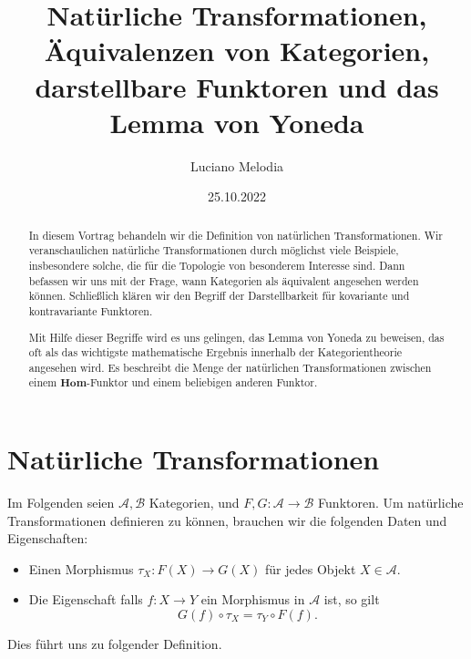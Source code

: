 \documentclass[leqno]{article}
\title{Natürliche Transformationen, Äquivalenzen von Kategorien, darstellbare Funktoren und das Lemma von Yoneda}
\author{Luciano Melodia}
\date{25.10.2022}
\theoremstyle{plain}
\theoremstyle{definition}
\theoremstyle{remark}
\begin{document}
\maketitle

\begin{abstract}
In diesem Vortrag behandeln wir die Definition von natürlichen Transformationen. Wir veranschaulichen natürliche Transformationen durch möglichst viele Beispiele, insbesondere solche, die für die Topologie von besonderem Interesse sind. Dann befassen wir uns mit der Frage, wann Kategorien als äquivalent angesehen werden können. Schließlich klären wir den Begriff der Darstellbarkeit für kovariante und kontravariante Funktoren.

Mit Hilfe dieser Begriffe wird es uns gelingen, das Lemma von Yoneda zu beweisen, das oft als das wichtigste mathematische Ergebnis innerhalb der Kategorientheorie angesehen wird. Es beschreibt die Menge der natürlichen Transformationen zwischen einem $\textbf{Hom}$-Funktor und einem beliebigen anderen Funktor.
\end{abstract}

\section{Natürliche Transformationen}
Im Folgenden seien $\mathcal{A},\mathcal{B}$ Kategorien, und $F,G: \mathcal{A} \rightarrow \mathcal{B}$ Funktoren. Um natürliche Transformationen definieren zu können, brauchen wir die folgenden Daten und Eigenschaften:
\begin{itemize}
	\item Einen Morphismus $\tau_{X}: F(X) \rightarrow G(X)$ für jedes Objekt $X \in \mathcal{A}$.
	\item Die Eigenschaft falls $f: X \rightarrow Y$ ein Morphismus in $\mathcal{A}$ ist, so gilt
	\begin{equation}
		G(f) \circ \tau_{X} = \tau_{Y} \circ F(f).
	\end{equation}
\end{itemize}
Dies führt uns zu folgender Definition.
\end{document}
